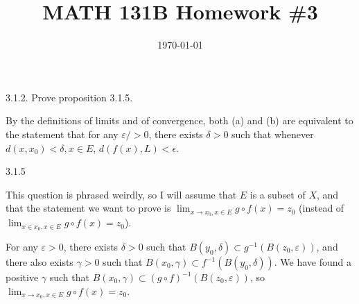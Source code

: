 \documentclass{article}
\date{\today}
\title{MATH 131B Homework \#3}
\begin{document}
\maketitle

\begin{prob}
    3.1.2. Prove proposition 3.1.5.
\end{prob}
 By the definitions of limits and of convergence, both (a) and (b) are equivalent to the statement that for any $\varepsilon/ > 0$, there exists $\delta > 0$ such that whenever $d(x, x_0) < \delta, x \in E$, $d(f(x), L) < \epsilon$.
\par
{} 

\bigskip
\begin{prob}
    3.1.5
\end{prob}
This question is phrased weirdly, so I will assume that $E$ is a subset of $X$, and that the statement we want to prove is $\lim_{x \rightarrow x_0, x \in E} g \circ f (x) = z_0$ (instead of $\lim_{x \in x_0, x \in E} g \circ f (x) = z_0$).
\par
For any $\varepsilon > 0$, there exists $\delta > 0$ such that $B(y_0, \delta) \subset g^{-1}(B(z_0, \varepsilon))$, and there also exists $\gamma > 0$ such that $B(x_0, \gamma) \subset f^{-1}(B(y_0, \delta))$. We have found a positive $\gamma$ such that $B(x_0, \gamma) \subset (g \circ f)^{-1}(B(z_0, \varepsilon))$, so $\lim_{x \rightarrow x_0, x \in E} g \circ f (x) = z_0$.
\end{document}
